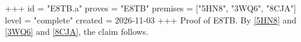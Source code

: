+++
id = "E8TB.a"
proves = "E8TB"
premises = ["5HN8", "3WQ6", "8CJA"]
level = "complete"
created = 2026-11-03
+++
Proof of E8TB. By \ref{5HN8} and \ref{3WQ6} and \ref{8CJA}, the claim follows.

